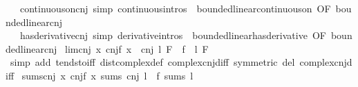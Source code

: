 \begin{isabellebody}
\ \ \ continuous{\isacharunderscore}{\kern0pt}on{\isacharunderscore}{\kern0pt}cnj\ {\isacharbrackleft}{\kern0pt}simp{\isacharcomma}{\kern0pt}\ continuous{\isacharunderscore}{\kern0pt}intros{\isacharbrackright}{\kern0pt}\ {\isacharequal}{\kern0pt}\ bounded{\isacharunderscore}{\kern0pt}linear{\isachardot}{\kern0pt}continuous{\isacharunderscore}{\kern0pt}on\ {\isacharbrackleft}{\kern0pt}OF\ bounded{\isacharunderscore}{\kern0pt}linear{\isacharunderscore}{\kern0pt}cnj{\isacharbrackright}{\kern0pt}\isanewline
\ \ \ has{\isacharunderscore}{\kern0pt}derivative{\isacharunderscore}{\kern0pt}cnj\ {\isacharbrackleft}{\kern0pt}simp{\isacharcomma}{\kern0pt}\ derivative{\isacharunderscore}{\kern0pt}intros{\isacharbrackright}{\kern0pt}\ {\isacharequal}{\kern0pt}\ bounded{\isacharunderscore}{\kern0pt}linear{\isachardot}{\kern0pt}has{\isacharunderscore}{\kern0pt}derivative\ {\isacharbrackleft}{\kern0pt}OF\ bounded{\isacharunderscore}{\kern0pt}linear{\isacharunderscore}{\kern0pt}cnj{\isacharbrackright}{\kern0pt}\isanewline
\isanewline
{}\isamarkupfalse%
\ lim{\isacharunderscore}{\kern0pt}cnj{\isacharcolon}{\kern0pt}\ {\isachardoublequoteopen}{\isacharparenleft}{\kern0pt}{\isacharparenleft}{\kern0pt}{\isasymlambda}x{\isachardot}{\kern0pt}\ cnj{\isacharparenleft}{\kern0pt}f\ x{\isacharparenright}{\kern0pt}{\isacharparenright}{\kern0pt}\ {\isasymlonglongrightarrow}\ cnj\ l{\isacharparenright}{\kern0pt}\ F\ {\isasymlongleftrightarrow}\ {\isacharparenleft}{\kern0pt}f\ {\isasymlonglongrightarrow}\ l{\isacharparenright}{\kern0pt}\ F{\isachardoublequoteclose}\isanewline
%
\isadelimproof
\ \ %
\endisadelimproof
%
\isatagproof
{}\isamarkupfalse%
\ {\isacharparenleft}{\kern0pt}simp\ add{\isacharcolon}{\kern0pt}\ tendsto{\isacharunderscore}{\kern0pt}iff\ dist{\isacharunderscore}{\kern0pt}complex{\isacharunderscore}{\kern0pt}def\ complex{\isacharunderscore}{\kern0pt}cnj{\isacharunderscore}{\kern0pt}diff\ {\isacharbrackleft}{\kern0pt}symmetric{\isacharbrackright}{\kern0pt}\ del{\isacharcolon}{\kern0pt}\ complex{\isacharunderscore}{\kern0pt}cnj{\isacharunderscore}{\kern0pt}diff{\isacharparenright}{\kern0pt}%
\endisatagproof
{\isafoldproof}%
%
\isadelimproof
\isanewline
%
\endisadelimproof
\isanewline
{}\isamarkupfalse%
\ sums{\isacharunderscore}{\kern0pt}cnj{\isacharcolon}{\kern0pt}\ {\isachardoublequoteopen}{\isacharparenleft}{\kern0pt}{\isacharparenleft}{\kern0pt}{\isasymlambda}x{\isachardot}{\kern0pt}\ cnj{\isacharparenleft}{\kern0pt}f\ x{\isacharparenright}{\kern0pt}{\isacharparenright}{\kern0pt}\ sums\ cnj\ l{\isacharparenright}{\kern0pt}\ {\isasymlongleftrightarrow}\ {\isacharparenleft}{\kern0pt}f\ sums\ l{\isacharparenright}{\kern0pt}{\isachardoublequoteclose}\isanewline

\end{isabellebody}
